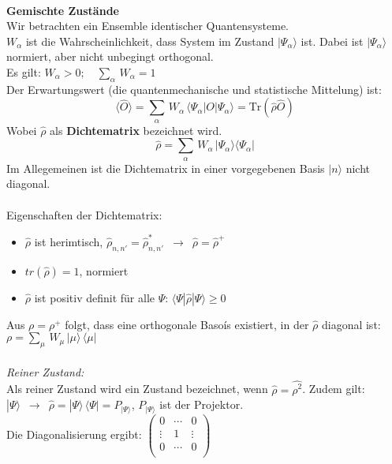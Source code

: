 \documentclass[a4paper,11pt]{scrartcl}
\begin{document}
\\
\textbf{Gemischte Zustände}\\
Wir betrachten ein Ensemble identischer Quantensysteme.\\
$W_{\alpha}$ ist die Wahrscheinlichkeit, dass System im Zustand $| \Psi_{\alpha} \rangle$ ist. Dabei ist  $| \Psi_{\alpha} \rangle$ normiert, aber nicht unbegingt orthogonal.\\
Es gilt: $W_{\alpha} > 0; \,\,\,\,\,\, \sum_{\alpha} \, W_{\alpha} = 1 $\\
Der Erwartungswert (die quantenmechanische und statistische Mittelung)  ist: 
$$ \langle \hat{O} \rangle  = \sum_{\alpha}\, W_{\alpha}\, \langle \Psi_{\alpha}| O | \Psi_{\alpha} \rangle = \mathrm{Tr}(\hat{\rho} \hat{O}) $$
Wobei $\hat{\rho}$ als \textbf{Dichtematrix} bezeichnet wird.
\begin{equation}
 \hat{\rho} = \sum_{\alpha} \, W_{\alpha} \, | \Psi_{\alpha} \rangle \langle \Psi_{\alpha} |
\end{equation}
Im Allegemeinen ist die Dichtematrix in einer vorgegebenen Basis $|n \rangle$ nicht diagonal.\\
\\
Eigenschaften der Dichtematrix: \\
\begin{itemize}
 \item $\hat{\rho}$ ist herimtisch, $ \hat{\rho}_{n,n'} = \hat{\rho}_{n,n'}^* \,\,\, \rightarrow \,\,\, \hat{\rho} = \hat{\rho}^+$
 \item $tr(\hat{\rho}) = 1$, normiert
 \item $\hat{\rho}$ ist positiv definit für alle $\Psi$: $\langle \Psi | \hat{\rho} | \Psi \rangle \geq 0$
\end{itemize}
Aus $\rho = \rho^+$ folgt, dass eine orthogonale Basoís existiert, in der $\hat{\rho}$ diagonal ist: $\rho = \sum_{\mu}\, W_{\mu} \, | \mu \rangle \, \langle \mu |$\\
\\
\textit{Reiner Zustand:} \\
Als reiner Zustand wird ein Zustand bezeichnet, wenn $\hat{\rho} = \hat{\rho^2}$. 
Zudem gilt: $ | \Psi \rangle \,\,\, \rightarrow \,\,\, \hat{\rho} = | \Psi \rangle  \, \langle  \Psi |  = P_{| \Psi \rangle}$, $P_{| \Psi \rangle}$ ist der Projektor.\\
Die Diagonalisierung ergibt: 
$\left( \begin{array}{rrr}
0 & \cdots & 0 \\
\vdots & 1 & \vdots  \\
0 & \cdots & 0  \\
\end{array}\right) $
\end{document}
